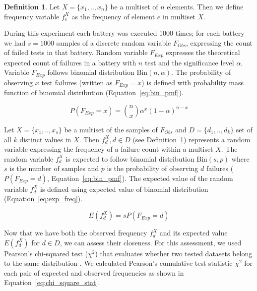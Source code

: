 \documentclass[
  digital,  	%
  color,		%
  oneside,   	%
  12pt,
  nocover,
  notable,
  nolof,
  nolot,
]{fithesis3}
\theoremstyle{definition}
\newtheorem{definition}{Definition}[section]
\theoremstyle{remark}
\begin{document}
\begin{definition}
\label{def:freq}
Let $X = \{x_1, .. ,x_n\}$ be a multiset of $n$ elements. Then we define frequency variable $f_{e}^{X}$ as the frequency of element $e$ in multiset $X$.
\end{definition}

During this experiment each battery was executed 1000 times; for each battery we had $s = 1000$ samples of a discrete random variable $F_{Obs}$, expressing the count of failed tests in that battery. Random variable $F_{Exp}$ expresses the theoretical expected count of failures in a battery with $n$ test and the significance level $\alpha$. Variable $F_{Exp}$ follows binomial distribution $\text{Bin}(n, \alpha)$. The probability of observing $x$ test failures (written as $F_{Exp} = x$) is defined with probability mass function of binomial distribution (Equation~\ref{eq:bin_pmf}).

\begin{equation}
\label{eq:bin_pmf}
P(F_{Exp} = x) = \binom nx \alpha^x (1-\alpha)^{n-x} 
\end{equation}

Let $X = \{x_1,..,x_s\}$ be a multiset of the samples of $F_{Obs}$ and $D = \{d_1,..,d_k\}$ set of all $k$ distinct values in $X$. Then $f_{d}^{X}, d \in D$ (see Definition~\ref{def:freq}) represents a random variable expressing the frequency of a failure count within a multiset $X$. The random variable $f_{d}^{X}$ is expected to follow binomial distribution $\text{Bin}(s, p)$ where $s$ is the number of samples and $p$ is the probability of observing $d$ failures ($P(F_{Exp} = d)$, Equation~\ref{eq:bin_pmf}). The expected value of the random variable $f_{d}^{X}$ is defined using expected value of binomial distribution (Equation~\ref{eq:exp_freq}).

\begin{equation}
\label{eq:exp_freq}
E\left(f_{d}^{X}\right) = s P(F_{Exp} = d)
\end{equation}

Now that we have both the observed frequency $f_{d}^{X}$ and its expected value $E\left(f_{d}^{X}\right)$ for $d \in D$, we can assess their closeness. For this assessment, we used Pearson's chi-squared test ($\chi^2$) that evaluates whether two tested datasets belong to the same distribution \cite[p.~219]{stat-handbook}. We calculated Pearson's cumulative test statistic $\chi^2$ for each pair of expected and observed frequencies as shown in Equation~\ref{eq:chi_square_stat}.
\end{document}
